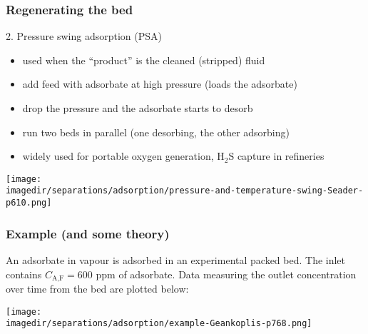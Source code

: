 \begin{frame}\frametitle{Regenerating the bed}
	2.	Pressure swing adsorption (PSA)
	\begin{itemize}
		\item	used when the ``product'' is the cleaned (stripped) fluid
		\item	add feed with adsorbate at high pressure (loads the adsorbate)
		\item	drop the pressure and the adsorbate starts to desorb
		\item	run two beds in parallel (one desorbing, the other adsorbing)
		\item	widely used for portable oxygen generation, $\text{H}_2\text{S}$ capture in refineries
	\end{itemize}
	\begin{center}
		\texttt{[image: \\imagedir/separations/adsorption/pressure-and-temperature-swing-Seader-p610.png]}
	\end{center}
	\vspace{-12pt}
\end{frame}

\begin{frame}\frametitle{Example (and some theory)}
	An adsorbate in vapour is adsorbed in an experimental packed bed. The inlet contains $C_\text{A,F} = 600$ ppm of adsorbate. Data measuring the outlet concentration over time from the bed are plotted below:

	\begin{center}
		\texttt{[image: \\imagedir/separations/adsorption/example-Geankoplis-p768.png]}
	\end{center}
	\vspace{-24pt}
\end{frame}

